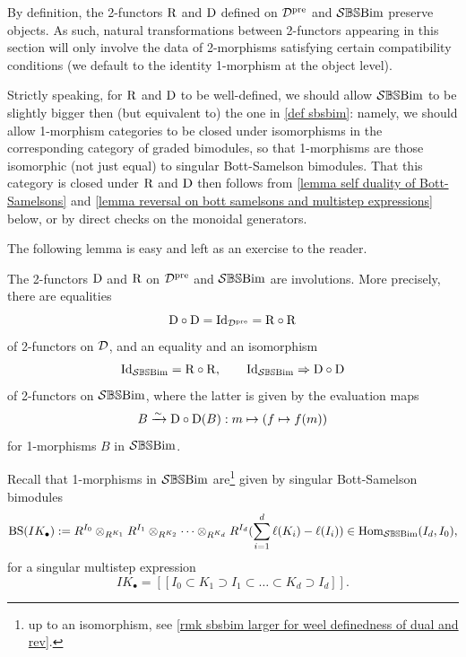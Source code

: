 \begin{remark}
    By definition, the 2-functors $\mathrm{R}$ and $\mathrm{D}$ defined on $\mathcal{D}^{\operatorname{pre}}$ and $\mathcal{S}\mathbb{BS}\text{Bim}$ preserve objects. As such, natural transformations between 2-functors appearing in this section will only involve the data of 2-morphisms satisfying certain compatibility conditions (we default to the identity 1-morphism at the object level).
\end{remark}

\begin{remark}\label{rmk sbsbim larger for weel definedness of dual and rev}
    Strictly speaking, for $\mathrm{R}$ and $\mathrm{D}$ to be well-defined, we should allow $\mathcal{S}\mathbb{BS}\text{Bim}$ to be slightly bigger then (but equivalent to) the one in \cref{def sbsbim}: namely, we should allow 1-morphism categories to be closed under isomorphisms in the corresponding category of graded bimodules, so that 1-morphisms are those isomorphic (not just equal) to singular Bott-Samelson bimodules. That this category is closed under $\mathrm{R}$ and $\mathrm{D}$ then follows from \cref{lemma self duality of Bott-Samelsons} and \cref{lemma reversal on bott samelsons and multistep expressions} below, or by direct checks on the monoidal generators.
\end{remark}


The following lemma is easy and left as an exercise to the reader.
\begin{lemma}\label{lemma dual and rev are involutions}
    The 2-functors $\mathrm{D}$ and $\mathrm{R}$ on $\mathcal{D}^{\operatorname{pre}}$ and $\mathcal{S}\mathbb{BS}\text{Bim}$ are involutions.
    More precisely, there are equalities
    $$\mathrm{D} \circ \mathrm{D} = \operatorname{Id}_{\mathcal{D}^{\operatorname{pre}}}= \mathrm{R} \circ \mathrm{R}$$
    of 2-functors on $\mathcal{D}$, and an equality and an isomorphism
    $$\operatorname{Id}_{\mathcal{S}\mathbb{BS}\text{Bim}}=\mathrm{R}\circ \mathrm{R}, \qquad \operatorname{Id}_{\mathcal{S}\mathbb{BS}\text{Bim}} \Rightarrow \mathrm{D} \circ \mathrm{D}$$ of 2-functors on $\mathcal{S}\mathbb{BS}\text{Bim}$, where the latter is given by the evaluation maps $$B \xrightarrow{\sim} \mathrm{D}\circ \mathrm{D}(B): m \mapsto(f\mapsto f(m))$$ for 1-morphisms $B$ in $\mathcal{S}\mathbb{BS}\text{Bim}$.
\end{lemma}

Recall that 1-morphisms in $\mathcal{S}\mathbb{BS}\text{Bim}$ are\footnote{up to an isomorphism, see \cref{rmk sbsbim larger for weel definedness of dual and rev}.} given by singular Bott-Samelson bimodules
\begin{equation*}
    \operatorname{BS}(IK_{\bullet}):= R^{I_0}\otimes_{R^{K_1}} R^{I_1}\otimes_{R^{K_2}} \cdots \otimes_{R^{K_d}}R^{I_d}(\sum_{i=1}^d \ell(K_i)-\ell(I_i)) \in \operatorname{Hom}_{\mathcal{S}\mathbb{BS}\text{Bim}}(I_d,I_0),
\end{equation*}
for a singular multistep expression
\begin{equation}\label{eq singular multistep expression supplementary}
    IK_{\bullet}=[[I_0 \subset K_1 \supset I_1 \subset \ldots \subset K_{d} \supset I_d]].
\end{equation}

